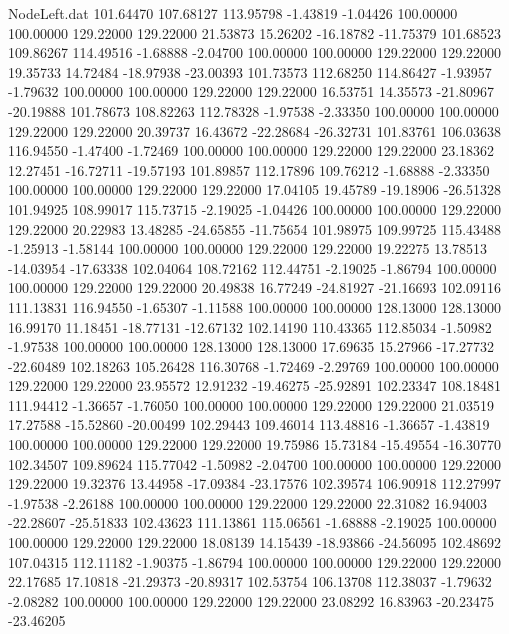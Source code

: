 \begin{filecontents}{NodeLeft.dat}
 101.64470  107.68127  113.95798    -1.43819   -1.04426  100.00000  100.00000  129.22000  129.22000   21.53873   15.26202  -16.18782  -11.75379
 101.68523  109.86267  114.49516    -1.68888   -2.04700  100.00000  100.00000  129.22000  129.22000   19.35733   14.72484  -18.97938  -23.00393
 101.73573  112.68250  114.86427    -1.93957   -1.79632  100.00000  100.00000  129.22000  129.22000   16.53751   14.35573  -21.80967  -20.19888
 101.78673  108.82263  112.78328    -1.97538   -2.33350  100.00000  100.00000  129.22000  129.22000   20.39737   16.43672  -22.28684  -26.32731
 101.83761  106.03638  116.94550    -1.47400   -1.72469  100.00000  100.00000  129.22000  129.22000   23.18362   12.27451  -16.72711  -19.57193
 101.89857  112.17896  109.76212    -1.68888   -2.33350  100.00000  100.00000  129.22000  129.22000   17.04105   19.45789  -19.18906  -26.51328
 101.94925  108.99017  115.73715    -2.19025   -1.04426  100.00000  100.00000  129.22000  129.22000   20.22983   13.48285  -24.65855  -11.75654
 101.98975  109.99725  115.43488    -1.25913   -1.58144  100.00000  100.00000  129.22000  129.22000   19.22275   13.78513  -14.03954  -17.63338
 102.04064  108.72162  112.44751    -2.19025   -1.86794  100.00000  100.00000  129.22000  129.22000   20.49838   16.77249  -24.81927  -21.16693
 102.09116  111.13831  116.94550    -1.65307   -1.11588  100.00000  100.00000  128.13000  128.13000   16.99170   11.18451  -18.77131  -12.67132
 102.14190  110.43365  112.85034    -1.50982   -1.97538  100.00000  100.00000  128.13000  128.13000   17.69635   15.27966  -17.27732  -22.60489
 102.18263  105.26428  116.30768    -1.72469   -2.29769  100.00000  100.00000  129.22000  129.22000   23.95572   12.91232  -19.46275  -25.92891
 102.23347  108.18481  111.94412    -1.36657   -1.76050  100.00000  100.00000  129.22000  129.22000   21.03519   17.27588  -15.52860  -20.00499
 102.29443  109.46014  113.48816    -1.36657   -1.43819  100.00000  100.00000  129.22000  129.22000   19.75986   15.73184  -15.49554  -16.30770
 102.34507  109.89624  115.77042    -1.50982   -2.04700  100.00000  100.00000  129.22000  129.22000   19.32376   13.44958  -17.09384  -23.17576
 102.39574  106.90918  112.27997    -1.97538   -2.26188  100.00000  100.00000  129.22000  129.22000   22.31082   16.94003  -22.28607  -25.51833
 102.43623  111.13861  115.06561    -1.68888   -2.19025  100.00000  100.00000  129.22000  129.22000   18.08139   14.15439  -18.93866  -24.56095
 102.48692  107.04315  112.11182    -1.90375   -1.86794  100.00000  100.00000  129.22000  129.22000   22.17685   17.10818  -21.29373  -20.89317
 102.53754  106.13708  112.38037    -1.79632   -2.08282  100.00000  100.00000  129.22000  129.22000   23.08292   16.83963  -20.23475  -23.46205

\end{filecontents}
